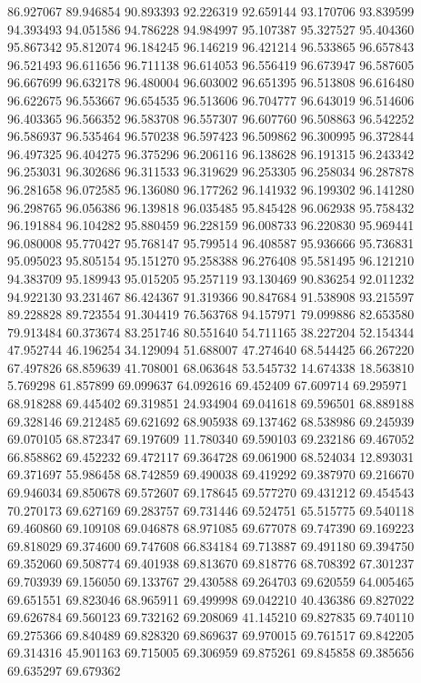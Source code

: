86.927067
89.946854
90.893393
92.226319
92.659144
93.170706
93.839599
94.393493
94.051586
94.786228
94.984997
95.107387
95.327527
95.404360
95.867342
95.812074
96.184245
96.146219
96.421214
96.533865
96.657843
96.521493
96.611656
96.711138
96.614053
96.556419
96.673947
96.587605
96.667699
96.632178
96.480004
96.603002
96.651395
96.513808
96.616480
96.622675
96.553667
96.654535
96.513606
96.704777
96.643019
96.514606
96.403365
96.566352
96.583708
96.557307
96.607760
96.508863
96.542252
96.586937
96.535464
96.570238
96.597423
96.509862
96.300995
96.372844
96.497325
96.404275
96.375296
96.206116
96.138628
96.191315
96.243342
96.253031
96.302686
96.311533
96.319629
96.253305
96.258034
96.287878
96.281658
96.072585
96.136080
96.177262
96.141932
96.199302
96.141280
96.298765
96.056386
96.139818
96.035485
95.845428
96.062938
95.758432
96.191884
96.104282
95.880459
96.228159
96.008733
96.220830
95.969441
96.080008
95.770427
95.768147
95.799514
96.408587
95.936666
95.736831
95.095023
95.805154
95.151270
95.258388
96.276408
95.581495
96.121210
94.383709
95.189943
95.015205
95.257119
93.130469
90.836254
92.011232
94.922130
93.231467
86.424367
91.319366
90.847684
91.538908
93.215597
89.228828
89.723554
91.304419
76.563768
94.157971
79.099886
82.653580
79.913484
60.373674
83.251746
80.551640
54.711165
38.227204
52.154344
47.952744
46.196254
34.129094
51.688007
47.274640
68.544425
66.267220
67.497826
68.859639
41.708001
68.063648
53.545732
14.674338
18.563810
5.769298
61.857899
69.099637
64.092616
69.452409
67.609714
69.295971
68.918288
69.445402
69.319851
24.934904
69.041618
69.596501
68.889188
69.328146
69.212485
69.621692
68.905938
69.137462
68.538986
69.245939
69.070105
68.872347
69.197609
11.780340
69.590103
69.232186
69.467052
66.858862
69.452232
69.472117
69.364728
69.061900
68.524034
12.893031
69.371697
55.986458
68.742859
69.490038
69.419292
69.387970
69.216670
69.946034
69.850678
69.572607
69.178645
69.577270
69.431212
69.454543
70.270173
69.627169
69.283757
69.731446
69.524751
65.515775
69.540118
69.460860
69.109108
69.046878
68.971085
69.677078
69.747390
69.169223
69.818029
69.374600
69.747608
66.834184
69.713887
69.491180
69.394750
69.352060
69.508774
69.401938
69.813670
69.818776
68.708392
67.301237
69.703939
69.156050
69.133767
29.430588
69.264703
69.620559
64.005465
69.651551
69.823046
68.965911
69.499998
69.042210
40.436386
69.827022
69.626784
69.560123
69.732162
69.208069
41.145210
69.827835
69.740110
69.275366
69.840489
69.828320
69.869637
69.970015
69.761517
69.842205
69.314316
45.901163
69.715005
69.306959
69.875261
69.845858
69.385656
69.635297
69.679362

